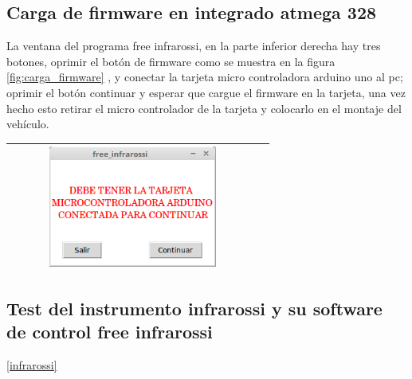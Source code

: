 \documentclass[12]{article}
\newenvironment{Figure}
{\par\medskip\noindent\minipage{\linewidth}}
{\endminipage\par\medskip}
\begin{document}
\begin{multicols}{2}
\subsection{Carga de firmware en integrado atmega 328}
La ventana del programa free infrarossi, en la parte inferior derecha hay tres botones, oprimir el botón de firmware  como se muestra en la figura \ref{fig:carga_firmware} , y conectar la tarjeta micro controladora arduino uno al pc; oprimir el botón continuar y esperar que cargue el firmware en la tarjeta, una vez hecho esto retirar el micro controlador de la tarjeta y colocarlo en el montaje del vehículo.
\begin{Figure}	
\center
\begin{tabular}{|l|r|}
\hline
\includegraphics[width=8cm, height=4cm]{img/firmware.png} \\ \hline
\end{tabular}
\label{fig:carga_firmware}
\end{Figure}
\subsection{Test del instrumento infrarossi y su software de control free infrarossi}
\ref{infrarossi}




\end{multicols}
\end{document}
